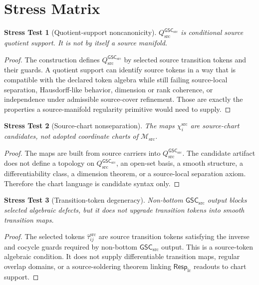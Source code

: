 \documentclass[11pt]{article}
\newcommand{\RespLC}{\mathsf{Resp}_{\mathrm{lc}}}
\newcommand{\Msrc}{\mathcal{M}_{\mathrm{src}}}
\newcommand{\GSC}{\mathsf{GSC}_{\mathrm{src}}}
\newcommand{\Qsrc}{Q_{\mathrm{src}}^{\GSC}}
\newcommand{\Tau}{\widehat{\tau}^{\mathrm{src}}}
\newtheorem{stress}{Stress Test}
\begin{document}
\section{Stress Matrix}

\begin{stress}[Quotient-support noncanonicity]
\(\Qsrc\) is conditional source quotient support. It is not by itself a
source manifold.
\end{stress}

\begin{proof}
The construction defines \(\Qsrc\) by selected source transition tokens and
their guards. A quotient support can identify source tokens in a way that is
compatible with the declared token algebra while still failing source-local
separation, Hausdorff-like behavior, dimension or rank coherence, or
independence under admissible source-cover refinement. Those are exactly the
properties a source-manifold regularity primitive would need to supply.
\end{proof}

\begin{stress}[Source-chart nonseparation]
The maps \(\chi_i^{\mathrm{src}}\) are source-chart candidates, not adopted
coordinate charts of \(\Msrc\).
\end{stress}

\begin{proof}
The maps are built from source carriers into \(\Qsrc\). The candidate artifact
does not define a topology on \(\Qsrc\), an open-set basis, a smooth structure,
a differentiability class, a dimension theorem, or a source-local separation
axiom. Therefore the chart language is candidate syntax only.
\end{proof}

\begin{stress}[Transition-token degeneracy]
Non-bottom \(\GSC\) output blocks selected algebraic defects, but it does not
upgrade transition tokens into smooth transition maps.
\end{stress}

\begin{proof}
The selected tokens \(\Tau_{ij}\) are source transition tokens satisfying the
inverse and cocycle guards required by non-bottom \(\GSC\) output. This is a
source-token algebraic condition. It does not supply differentiable transition
maps, regular overlap domains, or a source-soldering theorem linking
\(\RespLC\) readouts to chart support.
\end{proof}
\end{document}
